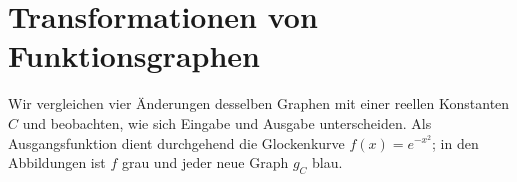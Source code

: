 \section{Transformationen von Funktionsgraphen}
\label{sec:real_functions_graph_transformations}
Wir vergleichen vier Änderungen desselben Graphen mit einer reellen
Konstanten $C$ und beobachten, wie sich Eingabe und Ausgabe unterscheiden.
Als Ausgangsfunktion dient durchgehend die Glockenkurve $f(x)=e^{-x^2}$;
in den Abbildungen ist $f$ grau und jeder neue Graph $g_C$ blau.


